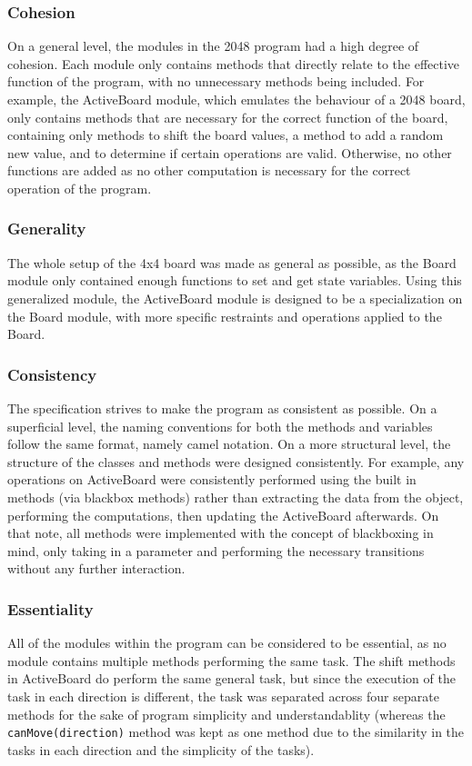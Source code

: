 \documentclass[12pt]{article}
\begin{document}
\subsubsection*{Cohesion}
On a general level, the modules in the 2048 program had a high degree of cohesion. Each module only contains methods that directly relate to the effective function of the program, with no unnecessary methods being included. For example, the ActiveBoard module, which emulates the behaviour of a 2048 board, only contains methods that are necessary for the correct function of the board, containing only methods to shift the board values, a method to add a random new value, and to determine if certain operations are valid. Otherwise, no other functions are added as no other computation is necessary for the correct operation of the program.

\subsubsection*{Generality}
The whole setup of the 4x4 board was made as general as possible, as the Board module only contained enough functions to set and get state variables. Using this generalized module, the ActiveBoard module is designed to be a specialization on the Board module, with more specific restraints and operations applied to the Board.

\subsubsection*{Consistency}
The specification strives to make the program as consistent as possible. On a superficial level, the naming conventions for both the methods and variables follow the same format, namely camel notation. On a more structural level, the structure of the classes and methods were designed consistently. For example, any operations on ActiveBoard were consistently performed using the built in methods (via blackbox methods) rather than extracting the data from the object, performing the computations, then updating the ActiveBoard afterwards. On that note, all methods were implemented with the concept of blackboxing in mind, only taking in a parameter and performing the necessary transitions without any further interaction.

\subsubsection*{Essentiality}
All of the modules within the program can be considered to be essential, as no module contains multiple methods performing the same task. The shift methods in ActiveBoard do perform the same general task, but since the execution of the task in each direction is different, the task was separated across four separate methods for the sake of program simplicity and understandablity (whereas the \texttt{canMove(direction)} method was kept as one method due to the similarity in the tasks in each direction and the simplicity of the tasks).
\end{document}
